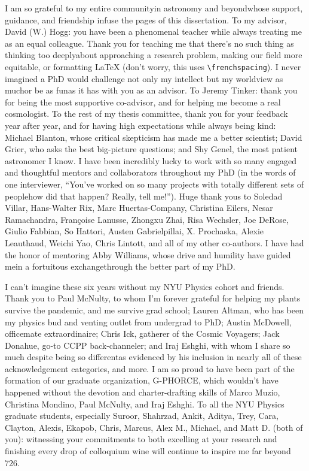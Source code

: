 I am so grateful to my entire community{\emdash}in astronomy and beyond{\emdash}whose support, guidance, and friendship infuse the pages of this dissertation.
To my advisor, David (W.) Hogg: you have been a phenomenal teacher while always treating me as an equal colleague.
Thank you for teaching me that there's no such thing as thinking too deeply{\emdash}about approaching a research problem, making our field more equitable, or formatting {\LaTeX} (don't worry, this uses \verb|\frenchspacing|).
I never imagined a PhD would challenge not only my intellect but my worldview as much{\emdash}or be as fun{\emdash}as it has with you as an advisor.
To Jeremy Tinker: thank you for being the most supportive co-advisor, and for helping me become a real cosmologist.
To the rest of my thesis committee, thank you for your feedback year after year, and for having high expectations while always being kind: Michael Blanton, whose critical skepticism has made me a better scientist; David Grier, who asks the best big-picture questions; and Shy Genel, the most patient astronomer I know.
I have been incredibly lucky to work with so many engaged and thoughtful mentors and collaborators throughout my PhD (in the words of one interviewer, ``You've worked on so many projects with totally different sets of people{\emdash}how did that happen? Really, tell me!'').
Huge thank yous to Soledad Villar, Hans-Walter Rix, Marc Huertas-Company, Christina Eilers, Nesar Ramachandra, Fran\c{c}oise Lanusse, Zhongxu Zhai, Risa Wechsler, Joe DeRose, Giulio Fabbian, So Hattori, Austen Gabrielpillai, X. Prochaska, Alexie Leauthaud, Weichi Yao, Chris Lintott, and all of my other co-authors.
I have had the honor of mentoring Abby Williams, whose drive and humility have guided me{\emdash}in a fortuitous exchange{\emdash}through the better part of my PhD.

I can't imagine these six years without my NYU Physics cohort and friends. 
Thank you to Paul McNulty, to whom I'm forever grateful for helping my plants survive the pandemic, and me survive grad school; Lauren Altman, who has been my physics bud and venting outlet from undergrad to PhD; Austin McDowell, officemate extraordinaire; Chris Ick, gatherer of the Cosmic Voyagers; Jack Donahue, go-to CCPP back-channeler; and Iraj Eshghi, with whom I share so much despite being so different{\emdash}as evidenced by his inclusion in nearly all of these acknowledgement categories, and more.
I am so proud to have been part of the formation of our graduate organization, G-PHORCE, which wouldn't have happened without the devotion and charter-drafting skills of Marco Muzio, Christina Mondino, Paul McNulty, and Iraj Eshghi.
To all the NYU Physics graduate students, especially Suroor, Shahrzad, Ankit, Aditya, Trey, Cara, Clayton, Alexis, Ekapob, Chris, Marcus, Alex M., Michael, and Matt D. (both of you): witnessing your commitments to both excelling at your research and finishing every drop of colloquium wine will continue to inspire me far beyond 726.

